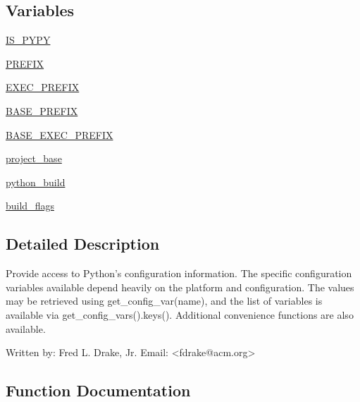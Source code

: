 \subsection*{Variables}
\begin{DoxyCompactItemize}
\item 
\hyperlink{namespacesetuptools_1_1__distutils_1_1sysconfig_a389e589d892972684e458c82a79253e3}{I\+S\+\_\+\+P\+Y\+PY}
\item 
\hyperlink{namespacesetuptools_1_1__distutils_1_1sysconfig_ace3a2db6a59bf7fe14248b1f884b0349}{P\+R\+E\+F\+IX}
\item 
\hyperlink{namespacesetuptools_1_1__distutils_1_1sysconfig_a1aa95c3eea28593eb491d15c655b1a9c}{E\+X\+E\+C\+\_\+\+P\+R\+E\+F\+IX}
\item 
\hyperlink{namespacesetuptools_1_1__distutils_1_1sysconfig_ae2bf2d5c82829a871e268203180b3676}{B\+A\+S\+E\+\_\+\+P\+R\+E\+F\+IX}
\item 
\hyperlink{namespacesetuptools_1_1__distutils_1_1sysconfig_a611c17135fc6090687f39401ac5f4a19}{B\+A\+S\+E\+\_\+\+E\+X\+E\+C\+\_\+\+P\+R\+E\+F\+IX}
\item 
\hyperlink{namespacesetuptools_1_1__distutils_1_1sysconfig_aed14adffa9ed239b60402b8e6e05139c}{project\+\_\+base}
\item 
\hyperlink{namespacesetuptools_1_1__distutils_1_1sysconfig_adc28f5858d695efd0ef8fe4f1ed974ab}{python\+\_\+build}
\item 
\hyperlink{namespacesetuptools_1_1__distutils_1_1sysconfig_a05e55ec4d7379f50722e5c2eeed849ac}{build\+\_\+flags}
\end{DoxyCompactItemize}


\subsection{Detailed Description}
\begin{DoxyVerb}Provide access to Python's configuration information.  The specific
configuration variables available depend heavily on the platform and
configuration.  The values may be retrieved using
get_config_var(name), and the list of variables is available via
get_config_vars().keys().  Additional convenience functions are also
available.

Written by:   Fred L. Drake, Jr.
Email:        <fdrake@acm.org>
\end{DoxyVerb}
 

\subsection{Function Documentation}
\mbox{\label{namespacesetuptools_1_1__distutils_1_1sysconfig_a39184aa4767e425939a4b038b24eb974}} 
